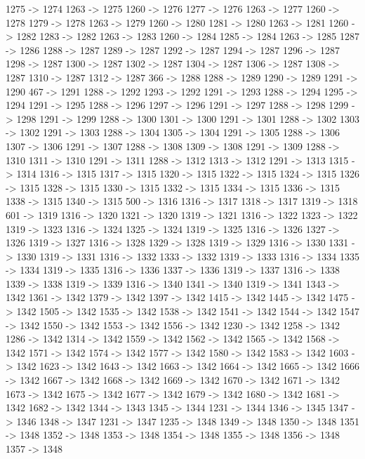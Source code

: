 {	1275 -> 1274
	1263 -> 1275
	1260 -> 1276
	1277 -> 1276
	1263 -> 1277
	1260 -> 1278
	1279 -> 1278
	1263 -> 1279
	1260 -> 1280
	1281 -> 1280
	1263 -> 1281
	1260 -> 1282
	1283 -> 1282
	1263 -> 1283
	1260 -> 1284
	1285 -> 1284
	1263 -> 1285
	1287 -> 1286
	1288 -> 1287
	1289 -> 1287
	1292 -> 1287
	1294 -> 1287
	1296 -> 1287
	1298 -> 1287
	1300 -> 1287
	1302 -> 1287
	1304 -> 1287
	1306 -> 1287
	1308 -> 1287
	1310 -> 1287
	1312 -> 1287
	366 -> 1288
	1288 -> 1289
	1290 -> 1289
	1291 -> 1290
	467 -> 1291
	1288 -> 1292
	1293 -> 1292
	1291 -> 1293
	1288 -> 1294
	1295 -> 1294
	1291 -> 1295
	1288 -> 1296
	1297 -> 1296
	1291 -> 1297
	1288 -> 1298
	1299 -> 1298
	1291 -> 1299
	1288 -> 1300
	1301 -> 1300
	1291 -> 1301
	1288 -> 1302
	1303 -> 1302
	1291 -> 1303
	1288 -> 1304
	1305 -> 1304
	1291 -> 1305
	1288 -> 1306
	1307 -> 1306
	1291 -> 1307
	1288 -> 1308
	1309 -> 1308
	1291 -> 1309
	1288 -> 1310
	1311 -> 1310
	1291 -> 1311
	1288 -> 1312
	1313 -> 1312
	1291 -> 1313
	1315 -> 1314
	1316 -> 1315
	1317 -> 1315
	1320 -> 1315
	1322 -> 1315
	1324 -> 1315
	1326 -> 1315
	1328 -> 1315
	1330 -> 1315
	1332 -> 1315
	1334 -> 1315
	1336 -> 1315
	1338 -> 1315
	1340 -> 1315
	500 -> 1316
	1316 -> 1317
	1318 -> 1317
	1319 -> 1318
	601 -> 1319
	1316 -> 1320
	1321 -> 1320
	1319 -> 1321
	1316 -> 1322
	1323 -> 1322
	1319 -> 1323
	1316 -> 1324
	1325 -> 1324
	1319 -> 1325
	1316 -> 1326
	1327 -> 1326
	1319 -> 1327
	1316 -> 1328
	1329 -> 1328
	1319 -> 1329
	1316 -> 1330
	1331 -> 1330
	1319 -> 1331
	1316 -> 1332
	1333 -> 1332
	1319 -> 1333
	1316 -> 1334
	1335 -> 1334
	1319 -> 1335
	1316 -> 1336
	1337 -> 1336
	1319 -> 1337
	1316 -> 1338
	1339 -> 1338
	1319 -> 1339
	1316 -> 1340
	1341 -> 1340
	1319 -> 1341
	1343 -> 1342
	1361 -> 1342
	1379 -> 1342
	1397 -> 1342
	1415 -> 1342
	1445 -> 1342
	1475 -> 1342
	1505 -> 1342
	1535 -> 1342
	1538 -> 1342
	1541 -> 1342
	1544 -> 1342
	1547 -> 1342
	1550 -> 1342
	1553 -> 1342
	1556 -> 1342
	1230 -> 1342
	1258 -> 1342
	1286 -> 1342
	1314 -> 1342
	1559 -> 1342
	1562 -> 1342
	1565 -> 1342
	1568 -> 1342
	1571 -> 1342
	1574 -> 1342
	1577 -> 1342
	1580 -> 1342
	1583 -> 1342
	1603 -> 1342
	1623 -> 1342
	1643 -> 1342
	1663 -> 1342
	1664 -> 1342
	1665 -> 1342
	1666 -> 1342
	1667 -> 1342
	1668 -> 1342
	1669 -> 1342
	1670 -> 1342
	1671 -> 1342
	1673 -> 1342
	1675 -> 1342
	1677 -> 1342
	1679 -> 1342
	1680 -> 1342
	1681 -> 1342
	1682 -> 1342
	1344 -> 1343
	1345 -> 1344
	1231 -> 1344
	1346 -> 1345
	1347 -> 1346
	1348 -> 1347
	1231 -> 1347
	1235 -> 1348
	1349 -> 1348
	1350 -> 1348
	1351 -> 1348
	1352 -> 1348
	1353 -> 1348
	1354 -> 1348
	1355 -> 1348
	1356 -> 1348
	1357 -> 1348
}
